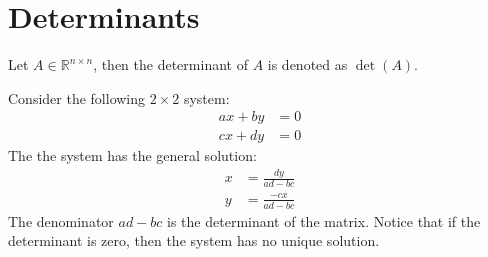 \documentclass[11pt]{article}
\begin{document}
\section{Determinants}
\begin{definition}[Determinant]
    Let $A \in \mathbb{R}^{n \times n}$, then the determinant of $A$ is denoted as $\det(A)$.
\end{definition}
\begin{example}
    Consider the following $2\times 2$ system:
    \begin{align*}
        ax + by &= 0 \\
        cx + dy &= 0
    \end{align*}
    The the system has the general solution:
    \begin{align*}
        x &= \frac{dy}{ad - bc} \\
        y &= \frac{-cx}{ad - bc}
    \end{align*}
    The denominator $ad - bc$ is the determinant of the matrix. Notice that if the determinant is zero, then the system has no unique solution.
\end{example}
\end{document}
